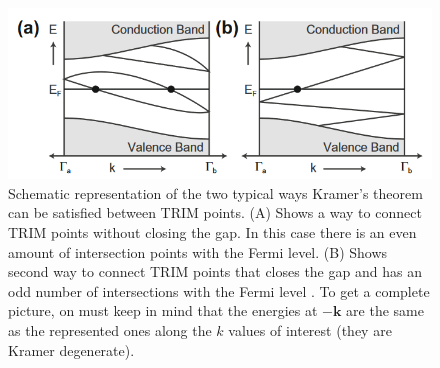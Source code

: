 \begin{figure}[!h]
    \includegraphics[scale = 0.8]{sections/visuel/kramer.png}
    \caption{Schematic representation of the two typical ways Kramer's theorem can be satisfied between TRIM points. (A) Shows a way to connect TRIM points without closing the gap. In this case there is an even amount of intersection points with the Fermi level. (B) Shows second way to connect TRIM points that closes the gap and has an odd number of intersections with the Fermi level \cite{kane_topological_2013}. To get a complete picture, on must keep in mind that the energies at $-\mathbf{k}$ are the same as the represented ones along the $k$ values of interest (they are Kramer degenerate).}
    \label{TRIM}
\end{figure}

